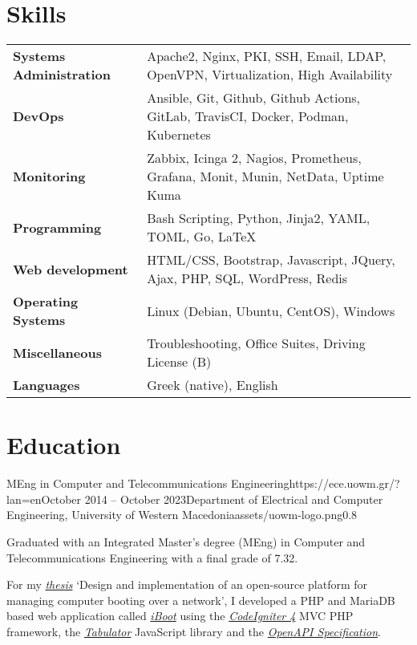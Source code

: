 \documentclass{mycv}
\begin{document}
	\section{Skills}
	\begin{tabular}{m{4.5cm} m{12.5cm}}
		\textbf{Systems Administration}	& Apache2, Nginx, PKI, SSH, Email, LDAP, OpenVPN, Virtualization, High Availability \\
		\textbf{DevOps}	                & Ansible, Git, Github, Github Actions, GitLab, TravisCI, Docker, Podman, Kubernetes \\
		\textbf{Monitoring}             & Zabbix, Icinga 2, Nagios, Prometheus, Grafana, Monit, Munin, NetData, Uptime Kuma \\
		\textbf{Programming} 	 	   	& Bash Scripting, Python, Jinja2, YAML, TOML, Go, \LaTeX \\
		\textbf{Web development}	   	& HTML/CSS, Bootstrap, Javascript, JQuery, Ajax, PHP, SQL, WordPress, Redis \\
		\textbf{Operating Systems}   	& Linux (Debian, Ubuntu, CentOS), Windows \\
		\textbf{Miscellaneous}         	& Troubleshooting, Office Suites, Driving License (B) \\
		\textbf{Languages} 			   	& Greek (native), English 
	\end{tabular}

	\section{Education}

	\begin{EntryDatedLogo}{MEng in Computer and Telecommunications Engineering}{https://ece.uowm.gr/?lan=en}{October 2014 -- October 2023}{Department of Electrical and Computer Engineering, University of Western Macedonia}{assets/uowm-logo.png}{0.8}
		\begin{Itemize}
			\item Graduated with an Integrated Master’s degree (MEng) in Computer and Telecommunications Engineering with a final grade of 7.32.
			\item For my \href{https://github.com/ChrisKar96/Thesis}{\textit{thesis}} `Design and implementation of an open-source platform for managing computer booting over a network', I developed a PHP and MariaDB based web application called \href{https://github.com/ChrisKar96/iBoot-Thesis}{\textit{iBoot}} using the \href{https://codeigniter.com/}{\textit{CodeIgniter 4}} MVC PHP framework, the \href{https://tabulator.info/}{\textit{Tabulator}} JavaScript library and the \href{https://swagger.io/specification/}{\textit{OpenAPI Specification}}.
   \end{Itemize}
	\end{EntryDatedLogo}
\end{document}
